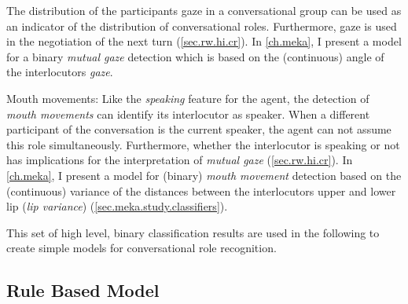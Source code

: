\begin{description}
The distribution of the participants gaze in a \gls{conversational group} can be used as an indicator of the distribution of \glspl{conversational role}.
Furthermore, gaze is used in the negotiation of the next \gls{turn} (\cref{sec.rw.hi.cr}).
In \cref{ch.meka}, I present a model for a binary \emph{mutual gaze} detection which is based on the (continuous) angle of the interlocutors \emph{gaze}.
\item{Mouth movements:} Like the \emph{speaking} feature for the agent, the detection of \emph{mouth movements} can identify its interlocutor as \gls{speaker}.
When a different participant of the \gls{conversation} is the current \gls{speaker}, the agent can not assume this role simultaneously.
Furthermore, whether the interlocutor is speaking or not has implications for the interpretation of \emph{mutual gaze} (\cref{sec.rw.hi.cr}).
In \cref{ch.meka}, I present a model for (binary) \emph{mouth movement} detection based on the (continuous) variance of the distances between the interlocutors upper and lower lip (\emph{lip variance}) (\cref{sec.meka.study.classifiers}).
\end{description}
This set of high level, binary classification results are used in the following to create simple models for \gls{conversational role} recognition.

\subsection{Rule Based Model}

